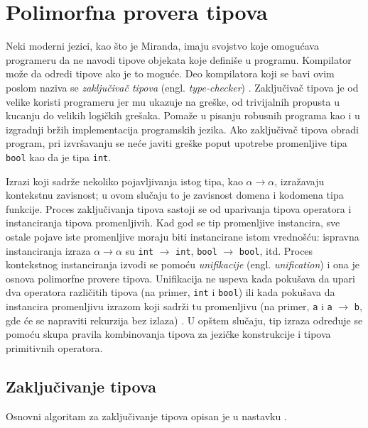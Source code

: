 \section{Polimorfna provera tipova}
\label{sec:provera tipova}

Neki moderni jezici, kao što je Miranda, imaju svojstvo koje omogućava programeru da ne navodi tipove objekata koje definiše u programu. Kompilator može da odredi tipove ako je to moguće. Deo kompilatora koji se bavi ovim poslom naziva se \textit{zaključivač tipova} (engl. \textit{type-checker}) \cite{the-implementation-of-functional-programming-languages}. Zaključivač tipova je od velike koristi programeru jer mu ukazuje na greške, od trivijalnih propusta u kucanju do velikih logičkih grešaka. Pomaže u pisanju robusnih programa kao i u izgradnji bržih implementacija programskih jezika. Ako zaključivač tipova obradi program, pri izvršavanju se neće javiti greške poput upotrebe promenljive tipa \verb|bool| kao da je tipa \verb|int|.

Izrazi koji sadrže nekoliko pojavljivanja istog tipa, kao $\alpha \longrightarrow \alpha$, izra\-ža\-vaju kontekstnu zavisnost; u ovom slučaju to je zavisnost domena i kodomena tipa funkcije. Proces zaključivanja tipova sastoji se od uparivanja tipova operatora i instanciranja tipova promenljivih. Kad god se tip promenljive instancira, sve ostale pojave iste promenljive moraju biti instancirane istom vrednošću: ispravna instanciranja izraza $\alpha \longrightarrow \alpha$ su \verb|int| $\longrightarrow$ \verb|int|,  \verb|bool| $\longrightarrow$ \verb|bool|, itd. Proces kontekstnog instanciranja izvodi se pomoću \textit{unifikacije} (engl. \textit{unification}) i ona je osnova polimorfne provere tipova. Unifikacija ne uspeva kada pokušava da upari dva operatora različitih tipova (na primer, \verb|int| i \verb|bool|) ili kada pokušava da instancira promenljivu izrazom koji sadrži tu promenljivu (na primer, \verb|a| i \verb|a| $\longrightarrow$ \verb|b|, gde će se napraviti rekurzija bez izlaza) \cite{basic-typechecking}. U opštem slučaju, tip izraza određuje se pomoću skupa pravila kombinovanja tipova za jezičke konstrukcije i tipova primitivnih operatora. 

\subsection{Zaključivanje tipova}
\label{subsec: zakljucivanje tipova}

Osnovni algoritam za zaključivanje tipova opisan je u nastavku \cite{basic-typechecking}.

